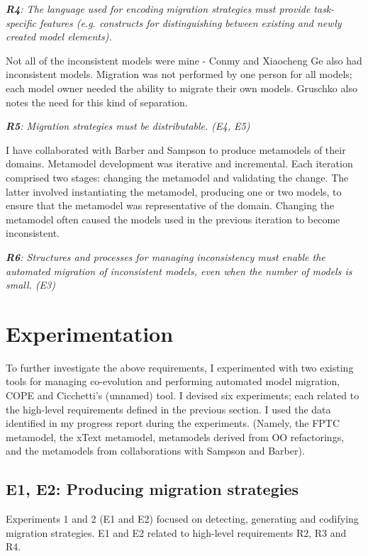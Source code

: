 \documentclass[a4paper]{article}
\begin{document}
\emph{\textbf{R4}: The language used for encoding migration strategies must provide task-specific features (e.g. constructs for distinguishing between existing and newly created model elements).}

Not all of the inconsistent models were mine - Conmy and Xiaocheng Ge also had inconsistent models. Migration was not performed by one person for all models; each model owner needed the ability to migrate their own models. Gruschko also notes the need for this kind of separation.

\emph{\textbf{R5}: Migration strategies must be distributable. (E4, E5)}

I have collaborated with Barber and Sampson to produce metamodels of their domains. Metamodel development was iterative and incremental. Each iteration comprised two stages: changing the metamodel and validating the change. The latter involved instantiating the metamodel, producing one or two models, to ensure that the metamodel was representative of the domain. Changing the metamodel often caused the models used in the previous iteration to become inconsistent.

\emph{\textbf{R6}: Structures and processes for managing inconsistency must enable the automated migration of inconsistent models, even when the number of models is small. (E3)}


\section{Experimentation}

To further investigate the above requirements, I experimented with two existing tools for managing co-evolution and performing automated model migration, COPE and Cicchetti's (unnamed) tool. I devised six experiments; each related to the high-level requirements defined in the previous section. I used the data identified in my progress report during the experiments. (Namely, the FPTC metamodel, the xText metamodel, metamodels derived from OO refactorings, and the metamodels from collaborations with Sampson and Barber).

\subsection{E1, E2: Producing migration strategies}

Experiments 1 and 2 (E1 and E2) focused on detecting, generating and codifying migration strategies. E1 and E2 related to high-level requirements R2, R3 and R4.
\end{document}
